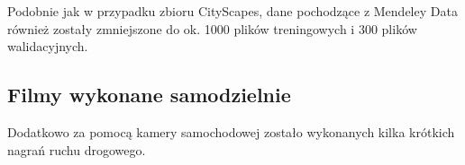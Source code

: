 

\hspace{0.5cm}
Podobnie jak w przypadku zbioru CityScapes, dane pochodzące z Mendeley Data również zostały zmniejszone do ok. 1000 plików treningowych i 300 plików walidacyjnych.

\subsection{Filmy wykonane samodzielnie}
\label{r:sanok}
\hspace{0.5cm}
Dodatkowo za pomocą kamery samochodowej zostało wykonanych kilka krótkich nagrań ruchu drogowego.


